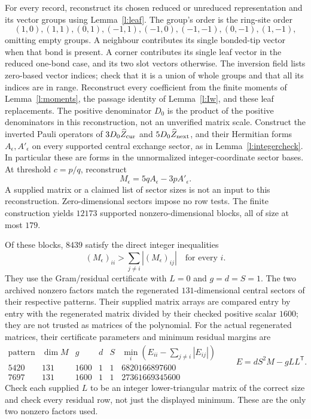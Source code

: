 For every record, reconstruct its chosen reduced or unreduced
representation and its vector groups using Lemma~\ref{l:leaf}.
The group's order is the ring-site order
\[
 (1,0),(1,1),(0,1),(-1,1),(-1,0),(-1,-1),(0,-1),(1,-1),
\]
omitting empty groups. A neighbour contributes its single bonded-tip
vector when that bond is present. A corner contributes its single
leaf vector in the reduced one-bond case, and its two slot vectors
otherwise. The inversion field lists zero-based vector indices;
check that it is a union of whole groups and that all its indices
are in range. Reconstruct every coefficient from the finite moments
of Lemma~\ref{l:moments}, the passage identity of
Lemma~\ref{l:Iw}, and these leaf replacements. The positive
denominator \(D_0\) is the product of the positive denominators in
this reconstruction, not an unverified matrix scale.
Construct the inverted Pauli operators of
\(3D_0\widehat Z_{\rm cur}\) and
\(5D_0\widehat Z_{\rm next}\), and their Hermitian forms
\(A_\epsilon,A'_\epsilon\) on every supported central exchange
sector, as in Lemma~\ref{l:integercheck}. In particular these are
forms in the unnormalized integer-coordinate sector bases.
At threshold \(c=p/q\), reconstruct
\[
 M_\epsilon=5qA_\epsilon-3pA'_\epsilon .
\]
A supplied matrix or a claimed list of sector sizes is not an
input to this reconstruction. Zero-dimensional sectors impose no
row tests. The finite construction yields \(12173\) supported
nonzero-dimensional blocks, all of size at most \(179\).

Of these blocks, \(8439\) satisfy the direct integer inequalities
\[
 (M_\epsilon)_{ii}>
       \sum_{j\ne i}|(M_\epsilon)_{ij}|\quad\text{for every }i.
\]
They use the Gram/residual certificate with \(L=0\) and
\(g=d=S=1\). The two archived nonzero factors match the regenerated
\(131\)-dimensional central sectors of their respective patterns.
Their supplied matrix arrays are compared entry by entry with the
regenerated matrix divided by their checked positive scalar
\(1600\); they are not trusted as matrices of the polynomial.
For the actual regenerated matrices, their certificate parameters
and minimum residual margins are
\[
 \begin{array}{c|r|rrr|r}
 \text{pattern}&\dim M&g&d&S&
       \min_i(E_{ii}-\sum_{j\ne i}|E_{ij}|)\\ \hline
 5420&131&1600&1&1&6820166897600\\
 7697&131&1600&1&1&27361669345600
 \end{array}
 \qquad E=dS^2M-gLL^{\mathsf T}.
\]
Check each supplied \(L\) to be an integer lower-triangular matrix
of the correct size and check every residual row, not just the
displayed minimum. These are the only two nonzero factors used.

